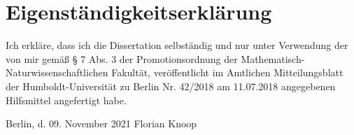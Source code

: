 \chapter{Eigenständigkeitserklärung}

Ich erkläre, dass ich die Dissertation selbständig und nur unter Verwendung der von mir gemäß § 7 Abs. 3 der Promotionsordnung der Mathematisch-Naturwissenschaftlichen Fakultät, veröffentlicht im Amtlichen Mitteilungsblatt der Humboldt-Universität zu Berlin Nr. 42/2018 am 11.07.2018 angegebenen Hilfsmittel angefertigt habe.

\vspace{7.5em}
Berlin, d. 09. November 2021
\hfill
Florian Knoop